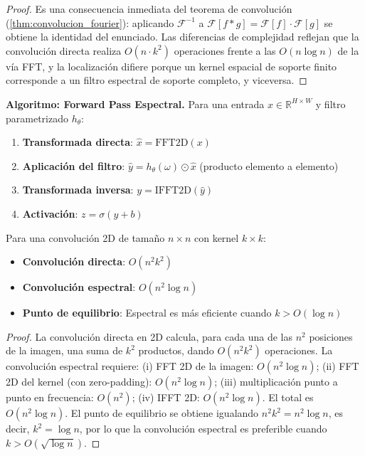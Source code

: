 \begin{proof}
Es una consecuencia inmediata del teorema de convolución (\autoref{thm:convolucion_fourier}): aplicando $\mathcal{F}^{-1}$ a $\mathcal{F}[f * g] = \mathcal{F}[f] \cdot \mathcal{F}[g]$ se obtiene la identidad del enunciado. Las diferencias de complejidad reflejan que la convolución directa realiza $O(n \cdot k^2)$ operaciones frente a las $O(n \log n)$ de la vía \gls{FFT}, y la localización difiere porque un kernel espacial de soporte finito corresponde a un filtro espectral de soporte completo, y viceversa.
\end{proof}

\textbf{Algoritmo: Forward Pass Espectral.}\label{alg:forward_espectral} Para una entrada $x \in \mathbb{R}^{H \times W}$ y filtro parametrizado $h_\theta$:
\begin{enumerate}
    \item \textbf{Transformada directa}: $\hat{x} = \text{FFT2D}(x)$
    \item \textbf{Aplicación del filtro}: $\hat{y} = h_\theta(\omega) \odot \hat{x}$ (producto elemento a elemento)
    \item \textbf{Transformada inversa}: $y = \text{IFFT2D}(\hat{y})$
    \item \textbf{Activación}: $z = \sigma(y + b)$
\end{enumerate}

\begin{theorem}\label{thm:complejidad_convoluciones_espectrales}
Para una convolución 2D de tamaño $n \times n$ con kernel $k \times k$:
\begin{itemize}
    \item \textbf{Convolución directa}: $O(n^2 k^2)$
    \item \textbf{Convolución espectral}: $O(n^2 \log n)$
    \item \textbf{Punto de equilibrio}: Espectral es más eficiente cuando $k > O(\log n)$
\end{itemize}
\end{theorem}

\begin{proof}
La convolución directa en 2D calcula, para cada una de las $n^2$ posiciones de la imagen, una suma de $k^2$ productos, dando $O(n^2 k^2)$ operaciones. La convolución espectral requiere: (i) FFT 2D de la imagen: $O(n^2 \log n)$; (ii) FFT 2D del kernel (con zero-padding): $O(n^2 \log n)$; (iii) multiplicación punto a punto en frecuencia: $O(n^2)$; (iv) IFFT 2D: $O(n^2 \log n)$. El total es $O(n^2 \log n)$. El punto de equilibrio se obtiene igualando $n^2 k^2 = n^2 \log n$, es decir, $k^2 = \log n$, por lo que la convolución espectral es preferible cuando $k > O(\sqrt{\log n})$.
\end{proof}

